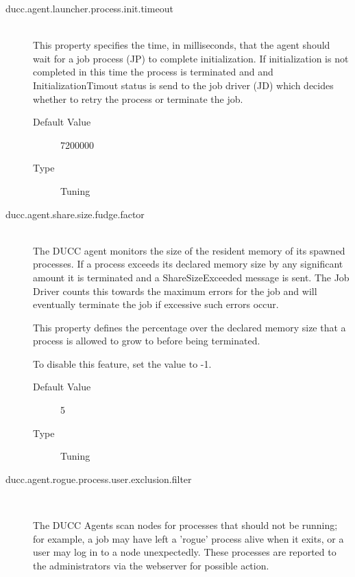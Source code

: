 \begin{description}
        \item[ducc.agent.launcher.process.init.timeout] \hfill \\
          This property specifies the time, in milliseconds, that the agent should wait for a job 
          process (JP) to complete initialization. If initialization is not completed in this time the 
          process is terminated and and InitializationTimout status is send to the job driver (JD) 
          which decides whether to retry the process or terminate the job. 

          \begin{description}
          \item[Default Value] 7200000 
          \item[Type] Tuning 
          \end{description}
          

        \item[ducc.agent.share.size.fudge.factor] \hfill \\

          The DUCC agent monitors the size of the resident memory of its spawned processes. If a 
          process exceeds its declared memory size by any significant amount it is terminated and 
          a ShareSizeExceeded message is sent. The Job Driver counts this towards the maximum 
          errors for the job and will eventually terminate the job if excessive such errors occur. 

          This property defines the percentage over the declared memory size that a process is 
          allowed to grow to before being terminated. 

          To disable this feature, set the value to -1. 
          \begin{description}
            \item[Default Value] 5 
            \item[Type] Tuning 
          \end{description}
          
          \item[ducc.agent.rogue.process.user.exclusion.filter] \hfill \\
          \label{itm:props-rogue.user}

            The DUCC Agents scan nodes for processes that should not be running; for example, 
            a job may have left a 'rogue' process alive when it exits, or a user may log in to a node 
            unexpectedly. These processes are reported to the administrators via the webserver for 
            possible action. 


\end{description}
